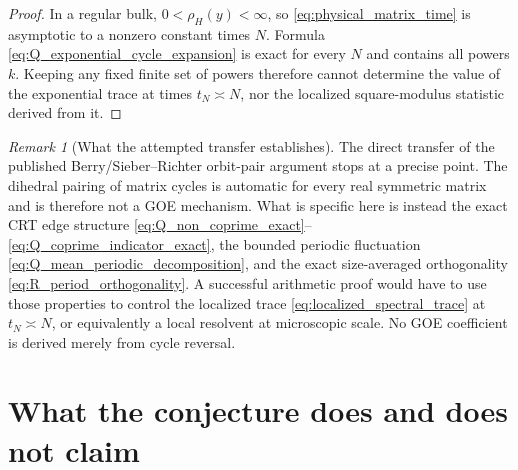 \documentclass[11pt]{amsart}
\numberwithin{equation}{section}
\theoremstyle{plain}
\theoremstyle{definition}
\theoremstyle{remark}
\newtheorem{remark}[theorem]{Remark}
\begin{document}
\begin{proof}
In a regular bulk, $0<\rho_H(y)<\infty$, so \eqref{eq:physical_matrix_time} is asymptotic to a nonzero constant times $N$.  Formula \eqref{eq:Q_exponential_cycle_expansion} is exact for every $N$ and contains all powers $k$.  Keeping any fixed finite set of powers therefore cannot determine the value of the exponential trace at times $t_N\asymp N$, nor the localized square-modulus statistic derived from it.
\end{proof}

\begin{remark}[What the attempted transfer establishes]
\label{rem:cycle_mechanism_status}
The direct transfer of the published Berry/Sieber--Richter orbit-pair argument stops at a precise point.  The dihedral pairing of matrix cycles is automatic for every real symmetric matrix and is therefore not a GOE mechanism.  What is specific here is instead the exact CRT edge structure \eqref{eq:Q_non_coprime_exact}--\eqref{eq:Q_coprime_indicator_exact}, the bounded periodic fluctuation \eqref{eq:Q_mean_periodic_decomposition}, and the exact size-averaged orthogonality \eqref{eq:R_period_orthogonality}.  A successful arithmetic proof would have to use those properties to control the localized trace \eqref{eq:localized_spectral_trace} at $t_N\asymp N$, or equivalently a local resolvent at microscopic scale.  No GOE coefficient is derived merely from cycle reversal.
\end{remark}

\section{What the conjecture does and does not claim}
\label{sec:scope}
\end{document}
